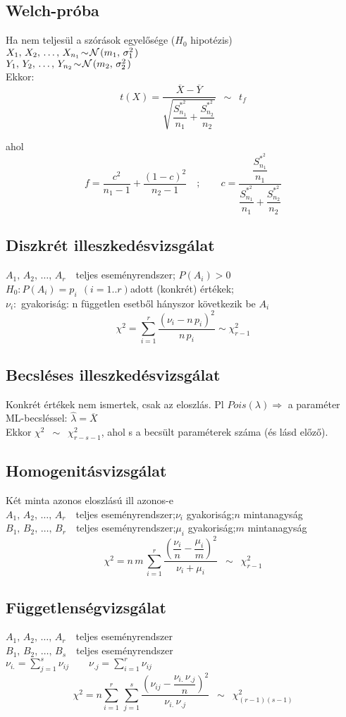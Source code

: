 \documentclass[a4paper,10pt,fleqn]{article}
\newcommand{\N}[2]{\mathcal{N}\hspace{.1em}(#1,\,#2\hspace{.1em})}
\newcommand{\nminta}[4]{#1_1,\,#1_2,\,\ldots,\, #1_{#2} \! \sim \! \N{#3}{#4}}
\newcommand{\ter}[2]{$#1_1,\,#1_2,\,\ldots,\, #1_{#2}$\ \ teljes
  eseményrendszer}
\newcommand{\terp}[2]{\ter{#1}{#2}; \quad $P(#1_i) > 0$}
\newcommand{\eloszlasa}{\enspace \sim \enspace}
\begin{document}
  \subsection*{Welch-próba}
  Ha nem teljesül a szórások egyelősége ($H_0$ hipotézis)\\
  $\nminta{X}{n_1}{m_1}{\sigma_1^2}$\\
  $\nminta{Y}{n_2}{m_2}{\sigma_2^2}$\\
  Ekkor:
  \[t(X) = \dfrac{\overline{\!X}-\overline{Y}}{\sqrt{ \dfrac {
	S_{n_1}^{*^2} }{n_1} + \dfrac{S_{n_2}^{*^2}}{n_2}}}
    \eloszlasa  t_f\]
  
  ahol \[ f = \dfrac {c^2}{n_1 - 1}  + \dfrac{(1-c)^2}{n_2 - 1 }\quad;
  \qquad
  c = \dfrac{\dfrac{S_{n_1}^{*^2}}{n_1}}{\dfrac{S_{n_1}^{*^2}}{n_1} +
    \dfrac{S_{n_2}^{*^2}}{n_2}} \]
  \newpage
  
  \subsection*{Diszkrét illeszkedésvizsgálat}
  \terp{A}r\\
  $H_0\colon P(A_i) = p_i\ \ (i=1..r)$\quad adott (konkrét) értékek;\\
  $\nu_i\colon$ gyakoriság: n független esetből  hányszor következik
  be $A_i$\\
  \[\displaystyle \chi^2 = \sum_{i=1}^r
  \dfrac{(\nu_i-n\,p_i)^2}{n\,p_i} \sim \chi^2_{r-1}\]

  \subsection*{Becsléses illeszkedésvizsgálat}
  Konkrét értékek nem ismertek, csak az eloszlás. Pl $Pois(\lambda)
  \Rightarrow$ a paraméter ML-becsléssel:
  $\displaystyle \hat{\lambda}=\overline{\!X}$\\
  Ekkor $\chi^2 \eloszlasa \chi^2_{r-s-1}$, ahol s a becsült paraméterek
  száma (és lásd előző).
  
  \subsection*{Homogenitásvizsgálat}
  Két minta azonos eloszlású ill azonos-e\\
  \ter{A}r;\quad $\nu_i$ gyakoriság;\quad $n$ mintanagyság\\
  \ter{B}r;\quad $\mu_i$ gyakoriság;\quad $m$ mintanagyság\\
  \[\chi^2 = n\,m\,\sum_{i=1}^r
  \dfrac{(\dfrac{\nu_i}n-\dfrac{\mu_i}m)^2}{\nu_i+\mu_i}
  \eloszlasa \chi^2_{r-1}\]
  
  \subsection*{Függetlenségvizsgálat}
  \ter{A}r\\
  \ter{B}s\\
  $\displaystyle \nu_{i.} = \sum_{j=1}^s \nu_{ij}\quad\quad
  \nu_{.j} = \sum_{i=1}^r \nu_{ij}$
  \[\displaystyle \chi^2= n\sum_{i=1}^r \, \sum_{j=1}^s
  \dfrac{( \nu_{ij} - \dfrac{ \nu_{i.}\,\nu_{.j} }n )^2
  }{ \nu_{i.}\,\nu_{.j}} \eloszlasa \chi^2_{(r-1)(s-1)}\]

  
  
\end{document}
